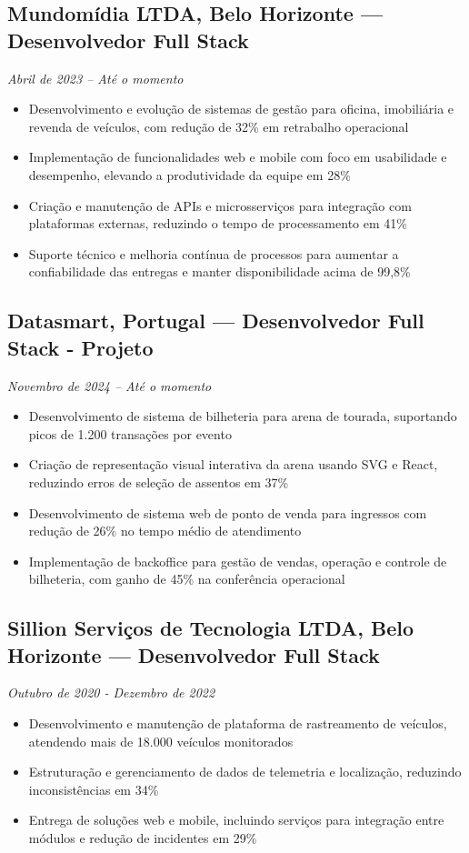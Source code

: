 \documentclass[11pt,a4paper]{article}
\newcommand{\experiencia}[4]{
    \subsection{#1, #2 — #3}
    \textit{#4}
    \vspace{4pt}
}
\begin{document}
\experiencia{Mundomídia LTDA}{Belo Horizonte}{Desenvolvedor Full Stack}{Abril de 2023 – Até o momento}
\begin{itemize}[leftmargin=20pt, topsep=0pt, itemsep=2pt]
    \item Desenvolvimento e evolução de sistemas de gestão para oficina, imobiliária e revenda de veículos, com redução de 32\% em retrabalho operacional
    \item Implementação de funcionalidades web e mobile com foco em usabilidade e desempenho, elevando a produtividade da equipe em 28\%
    \item Criação e manutenção de APIs e microsserviços para integração com plataformas externas, reduzindo o tempo de processamento em 41\%
    \item Suporte técnico e melhoria contínua de processos para aumentar a confiabilidade das entregas e manter disponibilidade acima de 99,8\%
\end{itemize}

\vspace{8pt}

\experiencia{Datasmart}{Portugal}{Desenvolvedor Full Stack - Projeto}{Novembro de 2024 – Até o momento}
\begin{itemize}[leftmargin=20pt, topsep=0pt, itemsep=2pt]
    \item Desenvolvimento de sistema de bilheteria para arena de tourada, suportando picos de 1.200 transações por evento
    \item Criação de representação visual interativa da arena usando SVG e React, reduzindo erros de seleção de assentos em 37\%
    \item Desenvolvimento de sistema web de ponto de venda para ingressos com redução de 26\% no tempo médio de atendimento
    \item Implementação de backoffice para gestão de vendas, operação e controle de bilheteria, com ganho de 45\% na conferência operacional
\end{itemize}

\vspace{8pt}

\experiencia{Sillion Serviços de Tecnologia LTDA}{Belo Horizonte}{Desenvolvedor Full Stack}{Outubro de 2020 - Dezembro de 2022}
\begin{itemize}[leftmargin=20pt, topsep=0pt, itemsep=2pt]
    \item Desenvolvimento e manutenção de plataforma de rastreamento de veículos, atendendo mais de 18.000 veículos monitorados
    \item Estruturação e gerenciamento de dados de telemetria e localização, reduzindo inconsistências em 34\%
    \item Entrega de soluções web e mobile, incluindo serviços para integração entre módulos e redução de incidentes em 29\%
\end{itemize}
\end{document}

